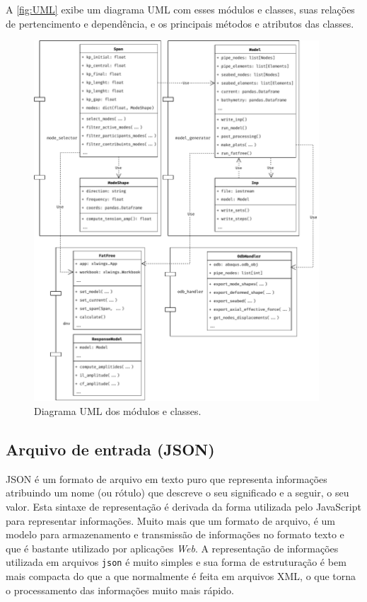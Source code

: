 A \autoref{fig:UML} exibe um diagrama UML com esses módulos e classes, suas relações de pertencimento e dependência, e os principais métodos e atributos das classes.

\begin{figure}[!ht]
    \centering
    \caption{Diagrama UML dos módulos e classes.}\label{fig:UML}
    \includegraphics[width=0.95\textwidth]{imagens/UML}
\end{figure}

\subsection{Arquivo de entrada (JSON)}\label{sec:estru_sim}

JSON é um formato de arquivo em texto puro que representa informações atribuindo um nome (ou rótulo) que descreve o seu significado e a seguir, o seu valor. Esta sintaxe de representação é derivada da forma utilizada pelo JavaScript para representar informações. Muito mais que um formato de arquivo, é um modelo para armazenamento e transmissão de informações no formato texto e que é bastante utilizado por aplicações \textit{Web}. A representação de informações utilizada em arquivos \texttt{json} é muito simples e sua forma de estruturação é bem mais compacta do que a que normalmente é feita em arquivos XML, o que torna o processamento das informações muito mais rápido.

